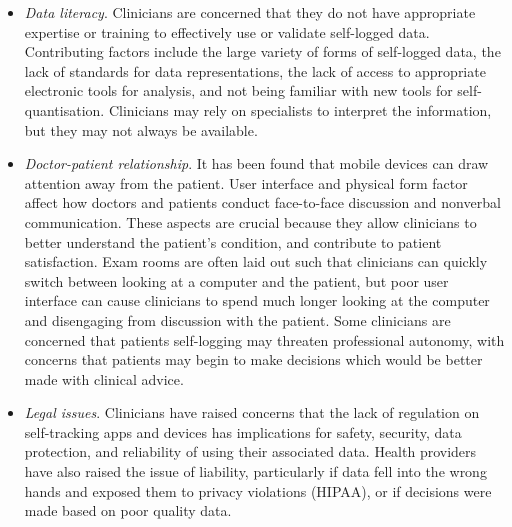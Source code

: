 \documentclass{sigchi}
\begin{document}
\begin{itemize}
    
    \item \textit{Data literacy}. Clinicians are concerned that they do not have appropriate expertise or training to effectively use or validate self-logged data. Contributing factors include the large variety of forms of self-logged data, the lack of standards for data representations, the lack of access to appropriate electronic tools for analysis, and not being familiar with new tools for self-quantisation. Clinicians may rely on specialists to interpret the information, but they may not always be available.
    
    \item \textit{Doctor-patient relationship}. It has been found that mobile devices can draw attention away from the patient. User interface and physical form factor affect how doctors and patients conduct face-to-face discussion and nonverbal communication. These aspects are crucial because they allow clinicians to better understand the patient's condition, and contribute to patient satisfaction. Exam rooms are often laid out such that clinicians can quickly switch between looking at a computer and the patient, but poor user interface can cause clinicians to spend much longer looking at the computer and disengaging from discussion with the patient. Some clinicians are concerned that patients self-logging may threaten professional autonomy, with concerns that patients may begin to make decisions which would be better made with clinical advice.

    
    
    \item \textit{Legal issues}. Clinicians have raised concerns that the lack of regulation on self-tracking apps and devices has implications for safety, security, data protection, and reliability of using their associated data. Health providers have also raised the issue of liability, particularly if data fell into the wrong hands and exposed them to privacy violations (HIPAA), or if decisions were made based on poor quality data.
\end{itemize}
\end{document}

